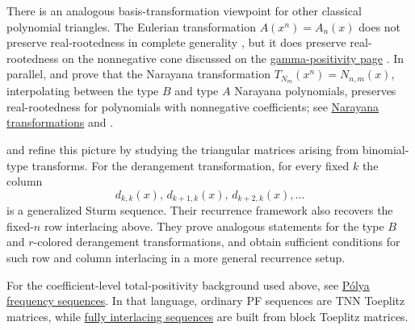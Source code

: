 There is an analogous basis-transformation viewpoint for other classical
polynomial triangles.  The Eulerian transformation $A(x^n)=A_n(x)$ does not
preserve real-rootedness in complete generality \cite{BrandenJochemko2022},
but it does preserve real-rootedness on the nonnegative cone discussed on the
\hyperref[gammaPositivity]{gamma-positivity page}
\cite{Athanasiadis2025EulerianTransformation}.  In parallel,
 and  prove that the Narayana
transformation $T_{N_m}(x^n)=N_{n,m}(x)$, interpolating between the type
$B$ and type $A$ Narayana polynomials, preserves real-rootedness for
polynomials with nonnegative coefficients; see
\hyperref[narayanaTransformations]{Narayana transformations} and
\cite{MaoWang2026x}.

 and 
\cite{LiuYan2025InterlacingEulerianDerangement} refine this picture by
studying the triangular matrices arising from binomial-type transforms.
For the derangement transformation, for every fixed $k$ the column
\[
  d_{k,k}(x),\,d_{k+1,k}(x),\,d_{k+2,k}(x),\dotsc
\]
is a generalized Sturm sequence.  Their recurrence framework also recovers
the fixed-$n$ row interlacing above.  They prove analogous statements for the
type $B$ and $r$-colored derangement transformations, and obtain sufficient
conditions for such row and column interlacing in a more general recurrence
setup.






\begin{remark*}
For the coefficient-level total-positivity background used above, see
\hyperref[polyaFrequency]{Pólya frequency sequences}.  In that language,
ordinary PF sequences are TNN Toeplitz matrices, while
\hyperref[fullyInterlacingLace]{fully interlacing sequences} are built from
block Toeplitz matrices.
\end{remark*}
